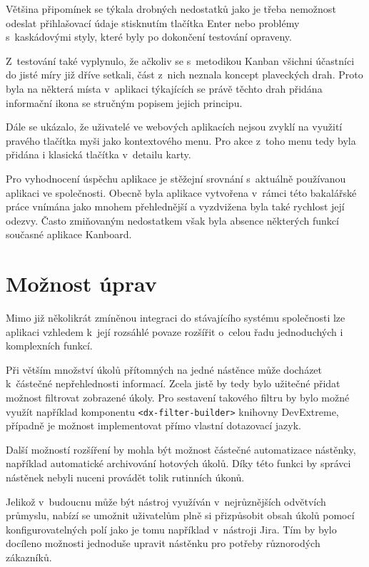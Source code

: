 Většina připomínek se týkala drobných nedostatků jako je třeba nemožnost odeslat přihlašovací údaje stisknutím tlačítka Enter nebo problémy s~kaskádovými styly, které byly po dokončení testování opraveny.

Z~testování také vyplynulo, že ačkoliv se s~metodikou Kanban všichni účastníci do jisté míry již dříve setkali, část z~nich neznala koncept plaveckých drah. Proto byla na některá místa v~aplikaci týkajících se právě těchto drah přidána informační ikona se stručným popisem jejich principu.

Dále se ukázalo, že uživatelé ve webových aplikacích nejsou zvyklí na využití pravého tlačítka myši jako kontextového menu. Pro akce z~toho menu tedy byla přidána i klasická tlačítka v~detailu karty. 

Pro vyhodnocení úspěchu aplikace je stěžejní srovnání s~aktuálně používanou aplikaci ve společnosti. Obecně byla aplikace vytvořena v~rámci této bakalářské práce vnímána jako mnohem přehlednější a vyzdvižena byla také rychlost její odezvy. Často zmiňovaným nedostatkem však byla absence některých funkcí současné aplikace Kanboard.

\section{Možnost úprav}
Mimo již několikrát zmíněnou integraci do stávajícího systému společnosti lze aplikaci vzhledem k~její rozsáhlé povaze rozšířit o~celou řadu jednoduchých i komplexních funkcí.

Při větším množství úkolů přítomných na jedné nástěnce může docházet k~částečné nepřehlednosti informací. Zcela jistě by tedy bylo užitečné přidat možnost filtrovat zobrazené úkoly. Pro sestavení takového filtru by bylo možné využít například komponentu \texttt{<dx-filter-builder>} knihovny DevExtreme, případně je možnost implementovat přímo vlastní dotazovací jazyk.

Další možností rozšíření by mohla být možnost částečné automatizace nástěnky, například automatické archivování hotových úkolů. Díky této funkci by správci nástěnek nebyli nuceni provádět tolik rutinních úkonů. 

Jelikož v~budoucnu může být nástroj využíván v~nejrůznějších odvětvích průmyslu, nabízí se umožnit uživatelům plně si přizpůsobit obsah úkolů pomocí konfigurovatelných polí jako je tomu například v~nástroji Jira. Tím by bylo docíleno možnosti jednoduše upravit nástěnku pro potřeby různorodých zákazníků.

